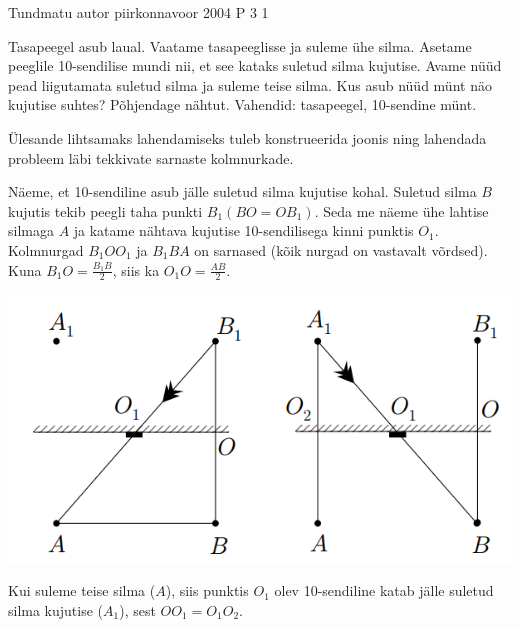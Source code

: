 {Tundmatu autor} %
{piirkonnavoor} %
{2004} %
{P 3} %
{1} %
{
\ifStatement
Tasapeegel asub laual. Vaatame tasapeeglisse ja suleme ühe silma. Asetame peeglile 10-sendilise mundi nii, et see kataks suletud silma kujutise. Avame nüüd pead liigutamata suletud silma ja suleme teise silma. Kus asub nüüd münt näo kujutise suhtes? Põhjendage nähtut. Vahendid: tasapeegel, 10-sendine münt.
\fi

\ifHint
Ülesande lihtsamaks lahendamiseks tuleb konstrueerida joonis ning lahendada probleem läbi tekkivate sarnaste kolmnurkade.
\fi


\ifSolution
Näeme, et 10-sendiline asub jälle suletud silma kujutise kohal. Suletud silma $B$ kujutis tekib peegli taha punkti $B_1 (BO = OB_1)$. Seda me näeme ühe lahtise silmaga $A$ ja katame nähtava kujutise 10-sendilisega kinni punktis $O_1$. Kolmnurgad $B_1OO_1$ ja $B_1BA$ on sarnased (kõik nurgad on vastavalt võrdsed). Kuna $B_1O = \frac{B_1B}{2}$, siis ka $O_1O = \frac{AB}{2}$. 
\begin{center}
	\includegraphics[width=0.5\linewidth]{2004-v2p-03-lah.PNG}
\end{center}
Kui suleme teise silma ($A$), siis punktis $O_1$ olev 10-sendiline katab jälle suletud silma kujutise ($A_1$), sest $OO_1 = O_1O_2$.
\fi
}